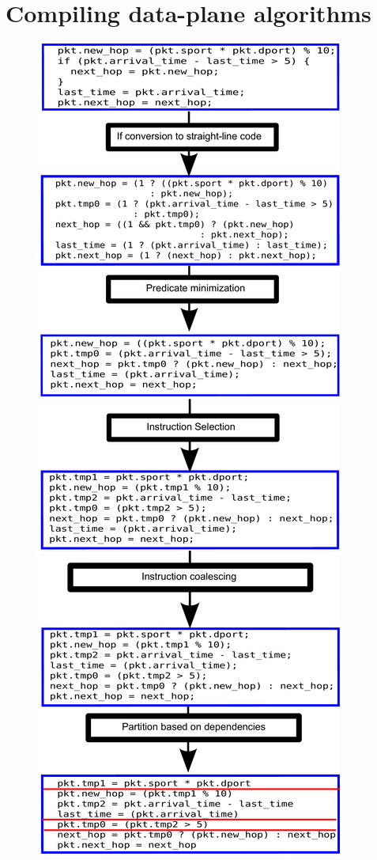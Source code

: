 \section{Compiling data-plane algorithms}


\label{s:compiler}

\begin{figure}
\includegraphics[width=\columnwidth]{compiler_flow.pdf}

\end{figure}
